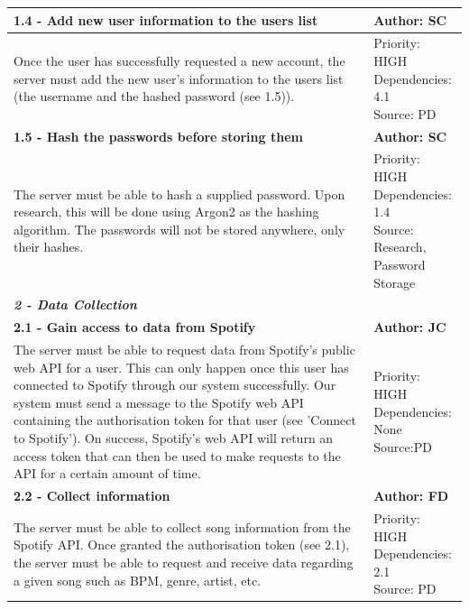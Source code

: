 \documentclass[10pt, notitlepage]{report}
\begin{document}
\begin{center}
\begin{longtable}{| p{13cm} | p{3cm} |}
\hline
\textbf{1.4 - Add new user information to the users list} & \textbf{Author: SC} \\
\hline
Once the user has successfully requested a new account, the server must add the new user’s information to the users list (the username and the hashed password (see 1.5)). &
\makecell{Priority: HIGH\\Dependencies: 4.1\\Source: PD}\\
\hline
\textbf{1.5 - Hash the passwords before storing them} & \textbf{Author: SC} \\
\hline
The server must be able to hash a supplied password. Upon research, this will be done using Argon2 as the hashing algorithm. The passwords will not be stored anywhere, only their hashes.&
\makecell{Priority: HIGH\\Dependencies: 1.4\\Source: Research,\\Password Storage}\\
\hline

\multicolumn{2}{|l|}{\textbf{\textit{2 - Data Collection}}} \\
\hline
\textbf{2.1 - Gain access to data from Spotify} & \textbf{Author: JC} \\
\hline
The server must be able to request data from Spotify’s public web API for a user. This can only happen once this user has connected to Spotify through our system successfully.
Our system must send a message to the Spotify web API containing the authorisation token for that user (see 'Connect to Spotify'). On success, Spotify's web API will return an access token that can then be used to make requests to the API for a certain amount of time.& 
\makecell{Priority: HIGH \\ Dependencies: None\\Source:PD} \\
\hline
\textbf{2.2 - Collect information} & \textbf{Author: FD} \\
\hline
The server must be able to collect song information from the Spotify API. Once granted the authorisation token (see 2.1), the server must be able to request and receive data regarding a given song such as BPM, genre, artist, etc.&
\makecell{Priority: HIGH\\Dependencies: 2.1\\Source: PD}\\
\hline


\end{longtable}
\end{center}
\end{document}
